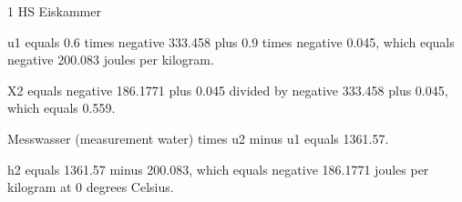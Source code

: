 1 HS Eiskammer

u1 equals 0.6 times negative 333.458 plus 0.9 times negative 0.045, which equals negative 200.083 joules per kilogram.

X2 equals negative 186.1771 plus 0.045 divided by negative 333.458 plus 0.045, which equals 0.559.

Messwasser (measurement water) times u2 minus u1 equals 1361.57.

h2 equals 1361.57 minus 200.083, which equals negative 186.1771 joules per kilogram at 0 degrees Celsius.